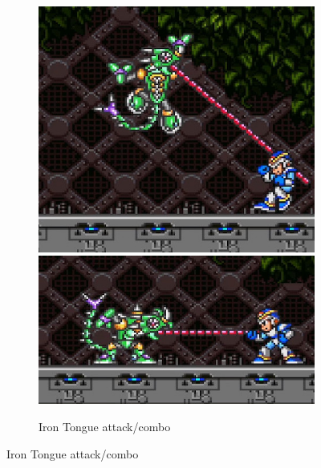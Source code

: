 \begin{figure}[htp]
	\centering
	\begin{subfigure}{\linewidth}
		\centering
		\includegraphics[width=0.4\linewidth]{figures/X1/Sting_chameleon/Chameleon_tongue_1.jpg}
		\includegraphics[width=0.5\linewidth]{figures/X1/Sting_chameleon/Chameleon_tongue_2.jpg}
		\caption{Iron Tongue attack/combo}
	\end{subfigure}
\end{figure}
